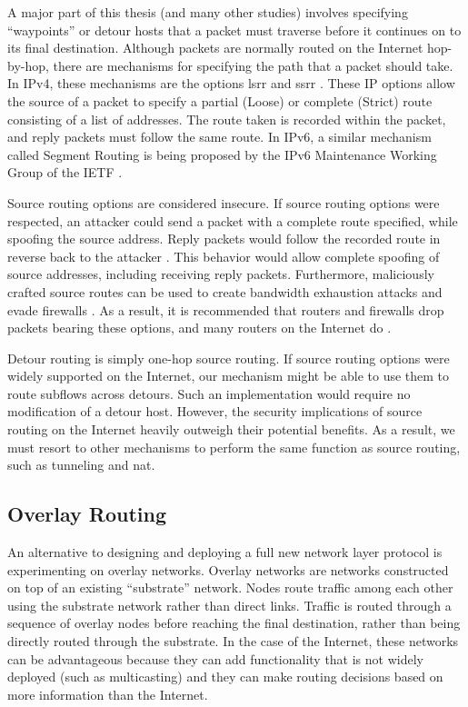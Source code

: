 \documentclass{cwru}
\begin{document}
A major part of this thesis (and many other studies) involves specifying
``waypoints'' or detour hosts that a packet must traverse before it continues on
to its final destination. Although packets are normally routed on the Internet
hop-by-hop, there are mechanisms for specifying the path that a packet should
take. In IPv4, these mechanisms are the options \ac{lsrr} and \ac{ssrr}
\cite{rfc791}. These IP options allow the source of a packet to specify a
partial (Loose) or complete (Strict) route consisting of a list of addresses.
The route taken is recorded within the packet, and reply packets must follow the
same route. In IPv6, a similar mechanism called Segment Routing is being
proposed by the IPv6 Maintenance Working Group of the IETF
\cite{draft-segment-routing}.

Source routing options are considered insecure. If source routing options were
respected, an attacker could send a packet with a complete route specified,
while spoofing the source address. Reply packets would follow the recorded route
in reverse back to the attacker \cite{bellovin1989security}. This behavior would
allow complete spoofing of source addresses, including receiving reply packets.
Furthermore, maliciously crafted source routes can be used to create bandwidth
exhaustion attacks and evade firewalls \cite{rfc7126}. As a result, it is
recommended that routers and firewalls drop packets bearing these options, and
many routers on the Internet do \cite{rfc7126}.

Detour routing is simply one-hop source routing. If source routing options were
widely supported on the Internet, our mechanism might be able to use them to
route subflows across detours. Such an implementation would require no
modification of a detour host. However, the security implications of source
routing on the Internet heavily outweigh their potential benefits. As a result,
we must resort to other mechanisms to perform the same function as source
routing, such as tunneling and \ac{nat}.

\subsection{Overlay Routing}

An alternative to designing and deploying a full new network layer protocol is
experimenting on overlay networks. Overlay networks are networks constructed on
top of an existing ``substrate'' network. Nodes route traffic among each other
using the substrate network rather than direct links. Traffic is routed through
a sequence of overlay nodes before reaching the final destination, rather than
being directly routed through the substrate. In the case of the Internet, these
networks can be advantageous because they can add functionality that is not
widely deployed (such as multicasting) and they can make routing decisions based
on more information than the Internet.
\end{document}
